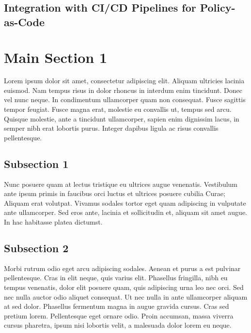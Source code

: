 
\subsection{Integration with CI/CD Pipelines for Policy-as-Code} %
\label{sec:Integration with CI/CD Pipelines for Policy-as-Code}



\section{Main Section 1}

Lorem ipsum dolor sit amet, consectetur adipiscing elit. Aliquam ultricies lacinia euismod. Nam tempus risus in dolor rhoncus in interdum enim tincidunt. Donec vel nunc neque. In condimentum ullamcorper quam non consequat. Fusce sagittis tempor feugiat. Fusce magna erat, molestie eu convallis ut, tempus sed arcu. Quisque molestie, ante a tincidunt ullamcorper, sapien enim dignissim lacus, in semper nibh erat lobortis purus. Integer dapibus ligula ac risus convallis pellentesque.

\subsection{Subsection 1}

Nunc posuere quam at lectus tristique eu ultrices augue venenatis. Vestibulum ante ipsum primis in faucibus orci luctus et ultrices posuere cubilia Curae; Aliquam erat volutpat. Vivamus sodales tortor eget quam adipiscing in vulputate ante ullamcorper. Sed eros ante, lacinia et sollicitudin et, aliquam sit amet augue. In hac habitasse platea dictumst.


\subsection{Subsection 2}
Morbi rutrum odio eget arcu adipiscing sodales. Aenean et purus a est pulvinar pellentesque. Cras in elit neque, quis varius elit. Phasellus fringilla, nibh eu tempus venenatis, dolor elit posuere quam, quis adipiscing urna leo nec orci. Sed nec nulla auctor odio aliquet consequat. Ut nec nulla in ante ullamcorper aliquam at sed dolor. Phasellus fermentum magna in augue gravida cursus. Cras sed pretium lorem. Pellentesque eget ornare odio. Proin accumsan, massa viverra cursus pharetra, ipsum nisi lobortis velit, a malesuada dolor lorem eu neque.

